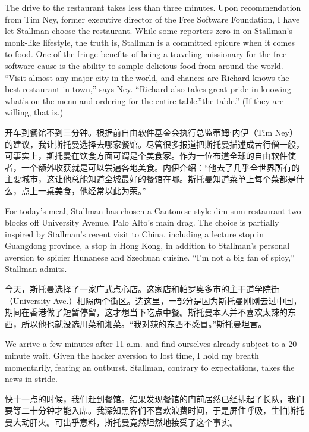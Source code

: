 \ifdefined\eng
The drive to the restaurant takes less than three minutes. Upon recommendation from Tim Ney, former executive director of the Free Software Foundation, I have let Stallman choose the restaurant. While some reporters zero in on Stallman's monk-like lifestyle, the truth is, Stallman is a committed epicure when it comes to food. One of the fringe benefits of being a traveling missionary for the free software cause is the ability to sample delicious food from around the world. ``Visit almost any major city in the world, and chances are Richard knows the best restaurant in town,'' says Ney. ``Richard also takes great pride in knowing what's on the menu and ordering for the entire \ifdefined\vone table.''\fi\ifdefined\vtwo the table.''  (If they are willing, that is.)\fi
\fi

\ifdefined\chs
开车到餐馆不到三分钟。根据前自由软件基金会执行总监蒂姆⋅内伊（Tim Ney）的建议，我让斯托曼选择去哪家餐馆。尽管很多报道把斯托曼描述成苦行僧一般，可事实上，斯托曼在饮食方面可谓是个美食家。作为一位布道全球的自由软件使者，一个额外收获就是可以尝遍各地美食。内伊介绍：``他去了几乎全世界所有的主要城市，这让他总能知道全城最好的餐馆在哪。斯托曼知道菜单上每个菜都是什么，点上一桌美食，他经常以此为荣。''
\fi

\ifdefined\eng
For today's meal, Stallman has chosen a Cantonese-style dim sum restaurant two blocks off University Avenue, Palo Alto's main drag. The choice is partially inspired by Stallman's recent visit to China, including \ifdefined\vone a lecture stop in Guangdong province, \fi\ifdefined\vtwo a stop in Hong Kong, \fi in addition to Stallman's personal aversion to spicier Hunanese and Szechuan cuisine. ``I'm not a big fan of spicy,'' Stallman admits.
\fi

\ifdefined\chs
今天，斯托曼选择了一家广式点心店。这家店和帕罗奥多市的主干道学院街（University Ave.）相隔两个街区。选这里，一部分是因为斯托曼刚刚去过中国，期间在香港做了短暂停留，这才想当下吃点中餐。斯托曼本人并不喜欢太辣的东西，所以他也就没选川菜和湘菜。``我对辣的东西不感冒。''斯托曼坦言。
\fi

\ifdefined\eng
We arrive a few minutes after 11 a.m. and find ourselves already subject to a 20-minute wait. Given the hacker aversion to lost time, I hold my breath momentarily, fearing an outburst. Stallman, contrary to expectations, takes the news in stride.
\fi

\ifdefined\chs
快十一点的时候，我们赶到餐馆。结果发现餐馆的门前居然已经排起了长队，我们要等二十分钟才能入席。我深知黑客们不喜欢浪费时间，于是屏住呼吸，生怕斯托曼大动肝火。可出乎意料，斯托曼竟然坦然地接受了这个事实。
\fi


